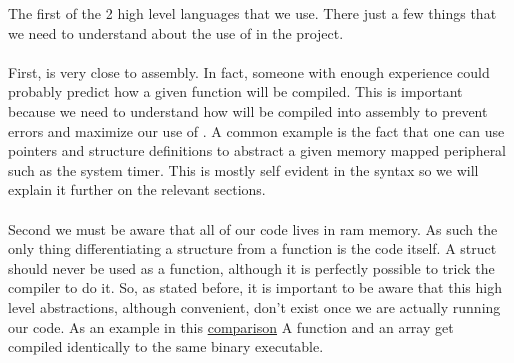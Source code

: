\documentclass[12pt, svgnames]{book}
\begin{document}
The first of the 2 high level languages that we use. There just a few things that we need to understand about the use of  in the project. 
\\~\\
First,  is very close to assembly. In fact, someone with enough experience could probably predict how a given  function will be compiled. This is important because we need to understand how  will be compiled into assembly to prevent errors and maximize our use of . A common example is the fact that one can use pointers and structure definitions to abstract a given memory mapped peripheral such as the system timer. This is mostly self evident in the syntax so we will explain it further on the relevant sections.
\\~\\
Second we must be aware that all of our code lives in ram memory. As such the only thing differentiating a structure from a function is the code itself. A struct should never be used as a function, although it is perfectly possible to trick the  compiler to do it. So, as stated before, it is important to be aware that this high level abstractions, although convenient, don't exist once we are actually running our code. As an example in this \hyperlink{fig_example}{comparison} A function and an array get compiled identically to the same binary executable. 

\hypertarget{fig_example}{}
\end{document}
